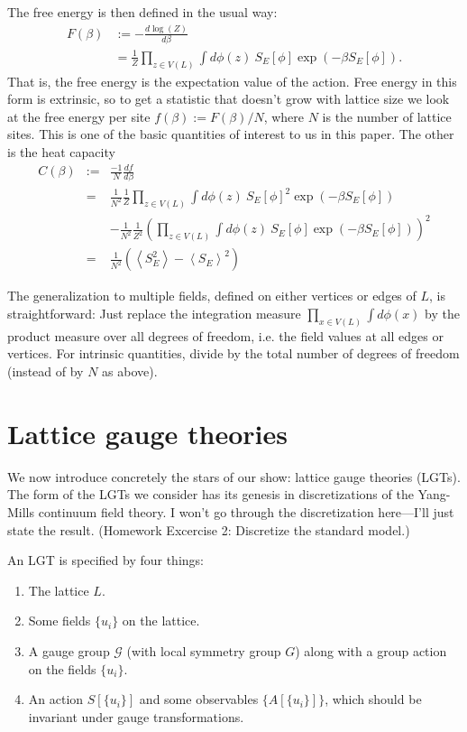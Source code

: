 \documentclass[9pt,twocolumn,twoside]{article}
\begin{document}
The free energy is then defined in the usual way:
\begin{align*}
F(\beta)& := -\frac{d \log(Z)}{d\beta}\\
& = \frac{1}{Z}  \prod_{z\in V(L)}\int d\phi(z) \: S_E[\phi] \exp(-\beta S_E[\phi]).
\end{align*}
That is, the free energy is the expectation value of the action.  Free energy in this form is extrinsic, so to get a statistic that doesn't grow with lattice size we look at the free energy per site $f(\beta):=F(\beta)/N$, where $N$ is the number of lattice sites.  This is one of the basic quantities of interest to us in this paper.  The other is the heat capacity 
\begin{eqnarray*}
C(\beta)& := & \frac{-1}{N}\frac{df}{d\beta}\\
& = & \frac{1}{N^2}\frac{1}{Z}  \prod_{z\in V(L)}\int d\phi(z) \: S_E[\phi]^2 \exp(-\beta S_E[\phi]) \\
& & -\frac{1}{N^2}\frac{1}{Z^2} \left( \prod_{z\in V(L)}\int d\phi(z) \: S_E[\phi] \exp(-\beta S_E[\phi])\right)^2 \\
& = & \frac{1}{N^2}\left(\left<S_E^2\right> - \left<S_E\right>^2\right)
\end{eqnarray*}

The generalization to multiple fields, defined on either vertices or edges of $L$, is straightforward: Just replace the integration measure $\prod_{x \in V(L)} \int d\phi(x)$ by the product measure over all degrees of freedom, i.e. the field values at all edges or vertices.  For intrinsic quantities, divide by the total number of degrees of freedom (instead of by $N$ as above).

\section{Lattice gauge theories}
We now introduce concretely the stars of our show: lattice gauge theories (LGTs).  The form of the LGTs we consider has its genesis in discretizations of the Yang-Mills continuum field theory.  I won't go through the discretization here---I'll just state the result.  (Homework Excercise 2: Discretize the standard model.)

An LGT is specified by four things:
\begin{enumerate}
\item The lattice $L$.
\item Some fields $\{u_i\}$ on the lattice.
\item A gauge group $\mathcal{G}$ (with local symmetry group $G$) along with a group action on the fields $\{u_i\}$.
\item An action $S[\{u_i\}]$ and some observables $\{A[\{u_i\}]\}$, which should be invariant under gauge transformations.
\end{enumerate}
\end{document}
